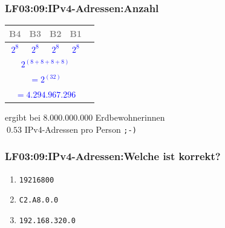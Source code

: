 \begin{frame}[fragile]  
  \frametitle{LF03:09:IPv4-Adressen:Anzahl}
  \vspace{0.2cm}
  \begin{footnotesize}
  \begin{center}
    \renewcommand{\arraystretch}{1.5}
    \begin{tabular}{|c|c|c|c|c|}
    \hline
    \textcolor{gray}{\tiny{B4}} & \textcolor{gray}{\tiny{B3}} & \textcolor{gray}{\tiny{B2}} 
    & \textcolor{gray}{\tiny{B1}}  \\
	  \hline
    \hline
	  \textcolor{blue}{\texttt{$2^8$}} & \textcolor{blue}{\texttt{$2^8$}} & \textcolor{blue}{\texttt{$2^8$}} & \textcolor{blue}{\texttt{$2^8$}} \\
    \hline
    \multicolumn{4}{|c|}{\textcolor{blue}{\texttt{$2^{(8 + 8 + 8 + 8)}$}}} \\
    \hline
    \multicolumn{4}{|c|}{\textcolor{blue}{\texttt{$= 2^{(32)}$}}} \\
    \hline
    \multicolumn{4}{|c|}{\textcolor{blue}{\texttt{$= 4.294.967.296$}}} \\
    \hline
  \end{tabular}
\end{center}
\end{footnotesize}

\vspace{0.4cm}
\begin{flushright}
\begin{tiny}
ergibt bei $8.000.000.000$ Erdbewohnerinnen\\ $~0.53$ IPv4-Adressen pro Person \texttt{;-)}
\end{tiny}
\end{flushright}

\end{frame}

\begin{frame}[fragile]  
  \frametitle{LF03:09:IPv4-Adressen:Welche ist korrekt?}
  \vspace{1cm}
  \begin{center}
  \begin{minipage}{0.5\textwidth}
  \begin{enumerate}
    \item \texttt{19216800}
    \item \texttt{C2.A8.0.0}
    \item \texttt{192.168.320.0}
  \end{enumerate}
  \end{minipage}
  \end{center}
\end{frame}



